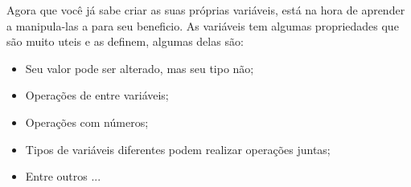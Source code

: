  Agora que você já sabe criar as suas próprias variáveis, está na hora de aprender a manipula-las a para seu beneficio. As variáveis tem algumas propriedades que são muito uteis e as definem, algumas delas são:


\begin{itemize}
	\item Seu valor pode ser alterado, mas seu tipo não;
	\item Operações de entre variáveis;
	\item Operações com números;
	\item Tipos de variáveis diferentes podem realizar operações juntas;
	\item Entre outros ...
\end{itemize}




